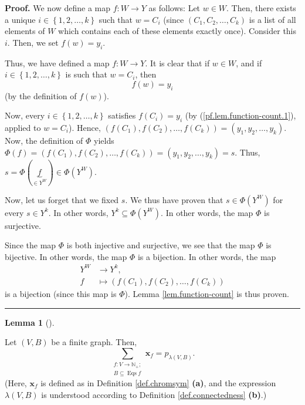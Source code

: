 \documentclass[numbers=enddot,12pt,final,onecolumn,notitlepage]{scrartcl}%
\theoremstyle{definition}
\newtheorem{lem}[theo]{Lemma}
\newenvironment{lemma}[1][]
{\begin{lem}[#1]\begin{leftbar}}
{\end{leftbar}\end{lem}}
\newenvironment{proof}[1][Proof]{\noindent\textbf{#1.} }{\ \rule{0.5em}{0.5em}}
\newenvironment{verlong}{}{}
\let\sumnonlimits\sum
\renewcommand{\sum}{\sumnonlimits\limits}
\begin{document}
\begin{verlong}
\begin{proof}
We now define a map $f:W\rightarrow Y$ as follows: Let $w\in W$. Then, there
exists a unique $i\in\left\{  1,2,\ldots,k\right\}  $ such that $w=C_{i}$
(since $\left(  C_{1},C_{2},\ldots,C_{k}\right)  $ is a list of all elements
of $W$ which contains each of these elements exactly once). Consider this $i$.
Then, we set $f\left(  w\right)  =y_{i}$.

Thus, we have defined a map $f:W\rightarrow Y$. It is clear that if $w\in W$,
and if $i\in\left\{  1,2,\ldots,k\right\}  $ is such that $w=C_{i}$, then%
\begin{equation}
f\left(  w\right)  =y_{i} \label{pf.lem.function-count.1}%
\end{equation}
(by the definition of $f\left(  w\right)  $).

Now, every $i\in\left\{  1,2,\ldots,k\right\}  $ satisfies $f\left(
C_{i}\right)  =y_{i}$ (by (\ref{pf.lem.function-count.1}), applied to
$w=C_{i}$). Hence, $\left(  f\left(  C_{1}\right)  ,f\left(  C_{2}\right)
,\ldots,f\left(  C_{k}\right)  \right)  =\left(  y_{1},y_{2},\ldots
,y_{k}\right)  $. Now, the definition of $\Phi$ yields $\Phi\left(  f\right)
=\left(  f\left(  C_{1}\right)  ,f\left(  C_{2}\right)  ,\ldots,f\left(
C_{k}\right)  \right)  =\left(  y_{1},y_{2},\ldots,y_{k}\right)  =s$. Thus,
$s=\Phi\left(  \underbrace{f}_{\in Y^{W}}\right)  \in\Phi\left(  Y^{W}\right)
$.

Now, let us forget that we fixed $s$. We thus have proven that $s\in
\Phi\left(  Y^{W}\right)  $ for every $s\in Y^{k}$. In other words,
$Y^{k}\subseteq\Phi\left(  Y^{W}\right)  $. In other words, the map $\Phi$ is surjective.

Since the map $\Phi$ is both injective and surjective, we see that the map
$\Phi$ is bijective. In other words, the map $\Phi$ is a bijection. In other
words, the map
\begin{align*}
Y^{W}  &  \rightarrow Y^{k},\\
f  &  \mapsto\left(  f\left(  C_{1}\right)  ,f\left(  C_{2}\right)
,\ldots,f\left(  C_{k}\right)  \right)
\end{align*}
is a bijection (since this map is $\Phi$). Lemma \ref{lem.function-count} is
thus proven.
\end{proof}
\end{verlong}

\begin{lemma}
\label{lem.Eqs.sum}Let $\left(  V,B\right)  $ be a finite graph. Then,%
\[
\sum_{\substack{f:V\rightarrow\mathbb{N}_{+};\\B\subseteq\operatorname*{Eqs}%
f}}\mathbf{x}_{f}=p_{\lambda\left(  V,B\right)  }.
\]
(Here, $\mathbf{x}_{f}$ is defined as in Definition \ref{def.chromsym}
\textbf{(a)}, and the expression $\lambda\left(  V,B\right)  $ is understood
according to Definition \ref{def.connectedness} \textbf{(b)}.)
\end{lemma}
\end{document}
